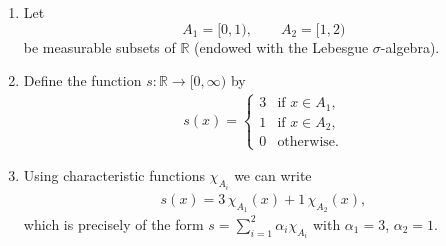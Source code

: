 \documentclass[12pt]{article}
\title{}
\author{Jerich Lee}
\date{\today}
\theoremstyle{definition} %
\theoremstyle{plain} %
\begin{document}
\maketitle

\begin{enumerate}
  \item Let 
  \[
      A_1=[0,1), 
      \qquad 
      A_2=[1,2)
  \]
  be measurable subsets of $\mathbb{R}$ (endowed with the Lebesgue $\sigma$-algebra).

  \item Define the function $s:\mathbb{R}\to[0,\infty)$ by
  \begin{align}
      s(x)=
      \begin{cases}
          3 & \text{if } x\in A_1,\\[6pt]
          1 & \text{if } x\in A_2,\\[6pt]
          0 & \text{otherwise.}
      \end{cases}
  \end{align}

  \item Using characteristic functions $\chi_{A_i}$ we can write
  \begin{align}
      s(x)=3\,\chi_{A_1}(x)+1\,\chi_{A_2}(x),
  \end{align}
  which is precisely of the form $\displaystyle s=\sum_{i=1}^{2}\alpha_i\chi_{A_i}$ with
  $\alpha_1=3$, $\alpha_2=1$.
\end{enumerate}
\pagebreak
\end{document}
